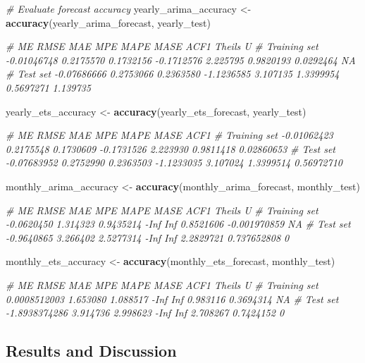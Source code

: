 \documentclass[
]{article}
\newenvironment{Shaded}{\begin{snugshade}}{\end{snugshade}}
\newcommand{\CommentTok}[1]{\textcolor[rgb]{0.56,0.35,0.01}{\textit{#1}}}
\newcommand{\FunctionTok}[1]{\textcolor[rgb]{0.13,0.29,0.53}{\textbf{#1}}}
\newcommand{\NormalTok}[1]{#1}
\newcommand{\OtherTok}[1]{\textcolor[rgb]{0.56,0.35,0.01}{#1}}
\begin{document}
\begin{Shaded}
\begin{Highlighting}[]
\CommentTok{\# Evaluate forecast accuracy}
\NormalTok{yearly\_arima\_accuracy }\OtherTok{\textless{}{-}} \FunctionTok{accuracy}\NormalTok{(yearly\_arima\_forecast, yearly\_test)}

\CommentTok{\#                     ME      RMSE       MAE        MPE     MAPE      MASE      ACF1 Theil\textquotesingle{}s U}
\CommentTok{\# Training set {-}0.01046748 0.2175570 0.1732156 {-}0.1712576 2.225795 0.9820193 0.0292464        NA}
\CommentTok{\# Test set     {-}0.07686666 0.2753066 0.2363580 {-}1.1236585 3.107135 1.3399954 0.5697271  1.139735}

\NormalTok{yearly\_ets\_accuracy }\OtherTok{\textless{}{-}} \FunctionTok{accuracy}\NormalTok{(yearly\_ets\_forecast, yearly\_test)}

\CommentTok{\#                     ME      RMSE       MAE        MPE     MAPE      MASE       ACF1}
\CommentTok{\# Training set {-}0.01062423 0.2175548 0.1730609 {-}0.1731526 2.223930 0.9811418 0.02860653}
\CommentTok{\# Test set     {-}0.07683952 0.2752990 0.2363503 {-}1.1233035 3.107024 1.3399514 0.56972710}
             
\NormalTok{monthly\_arima\_accuracy }\OtherTok{\textless{}{-}} \FunctionTok{accuracy}\NormalTok{(monthly\_arima\_forecast, monthly\_test)}

\CommentTok{\#                     ME     RMSE       MAE  MPE MAPE      MASE         ACF1 Theil\textquotesingle{}s U}
\CommentTok{\# Training set {-}0.0620450 1.314323 0.9435214 {-}Inf  Inf 0.8521606 {-}0.001970859        NA}
\CommentTok{\# Test set     {-}0.9640865 3.266402 2.5277314 {-}Inf  Inf 2.2829721  0.737652808         0}

\NormalTok{monthly\_ets\_accuracy }\OtherTok{\textless{}{-}} \FunctionTok{accuracy}\NormalTok{(monthly\_ets\_forecast, monthly\_test)}

\CommentTok{\#                       ME     RMSE      MAE  MPE MAPE     MASE      ACF1 Theil\textquotesingle{}s U}
\CommentTok{\# Training set  0.0008512003 1.653080 1.088517 {-}Inf  Inf 0.983116 0.3694314        NA}
\CommentTok{\# Test set     {-}1.8938374286 3.914736 2.998623 {-}Inf  Inf 2.708267 0.7424152         0}
\end{Highlighting}
\end{Shaded}

\subsection{Results and Discussion}\label{results-and-discussion}
\end{document}
